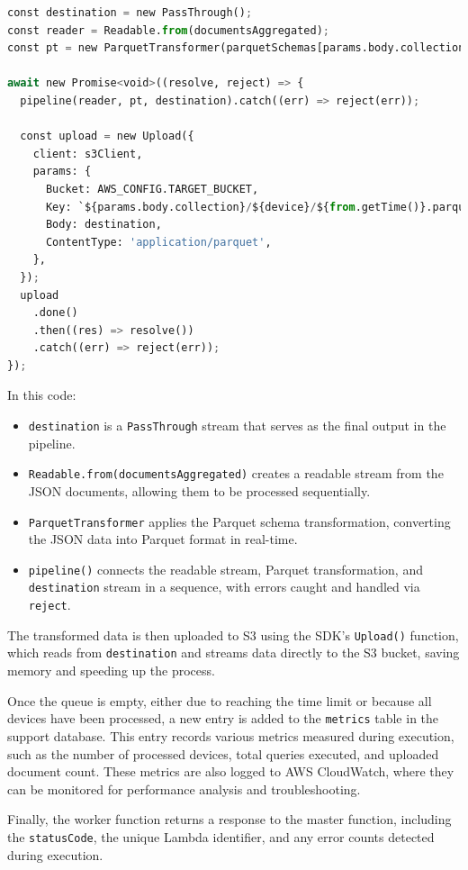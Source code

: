 \begin{lstlisting}[language=Python]
const destination = new PassThrough();
const reader = Readable.from(documentsAggregated);
const pt = new ParquetTransformer(parquetSchemas[params.body.collection]);

await new Promise<void>((resolve, reject) => {
  pipeline(reader, pt, destination).catch((err) => reject(err));

  const upload = new Upload({
    client: s3Client,
    params: {
      Bucket: AWS_CONFIG.TARGET_BUCKET,
      Key: `${params.body.collection}/${device}/${from.getTime()}.parquet`,
      Body: destination,
      ContentType: 'application/parquet',
    },
  });
  upload
    .done()
    .then((res) => resolve())
    .catch((err) => reject(err));
});
\end{lstlisting}

In this code:
\begin{itemize}
    \item \texttt{destination} is a \texttt{PassThrough} stream that serves as the final output in the pipeline.
    \item \texttt{Readable.from(documentsAggregated)} creates a readable stream from the \ac{JSON} documents, allowing them to be processed sequentially.
    \item \texttt{ParquetTransformer} applies the Parquet schema transformation, converting the \ac{JSON} data into Parquet format in real-time.
    \item \texttt{pipeline()} connects the readable stream, Parquet transformation, and \texttt{destination} stream in a sequence, with errors caught and handled via \texttt{reject}.
\end{itemize}
The transformed data is then uploaded to \ac{S3} using the \ac{SDK}'s \texttt{Upload()} function, which reads from \texttt{destination} and streams data directly to the \ac{S3} bucket, saving memory and speeding up the process.

Once the queue is empty, either due to reaching the time limit or because all devices have been processed, a new entry is added to the \texttt{metrics} table in the support database. This entry records various metrics measured during execution, such as the number of processed devices, total queries executed, and uploaded document count. These metrics are also logged to \ac{AWS} CloudWatch, where they can be monitored for performance analysis and troubleshooting.

Finally, the worker function returns a response to the master function, including the \texttt{statusCode}, the unique Lambda identifier, and any error counts detected during execution.


